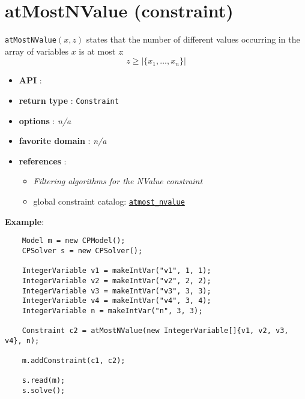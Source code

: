 \label{atmostnvalue}
\hypertarget{atmostnvalue}{}

\section{atMostNValue (constraint)}\label{atmostnvalue:atmostnvalueconstraint}\hypertarget{atmostnvalue:atmostnvalueconstraint}{}
\begin{notedef}
\texttt{atMostNValue}$(x,z)$ states that the number of different values occurring in the array of variables $x$ is at most \emph{z}:
$$z\ge|\{x_1,\ldots,x_n\}|$$  
\end{notedef}

\begin{itemize}
	\item \textbf{API} : 
	\item \textbf{return type} : \texttt{Constraint}
	\item \textbf{options} : \emph{n/a}
	\item \textbf{favorite domain} : \emph{n/a}
	\item \textbf{references} :
      \begin{itemize}
      \item  \cite{BessiereCPAIOR05} \emph{Filtering algorithms for the NValue constraint}
      \item global constraint catalog: \href{http://www.emn.fr/x-info/sdemasse/gccat/Catmost_nvalue.html}{\tt atmost\_nvalue}
      \end{itemize}
    \end{itemize}

\textbf{Example}:
\begin{lstlisting}
	Model m = new CPModel();
	CPSolver s = new CPSolver();
	
	IntegerVariable v1 = makeIntVar("v1", 1, 1);
	IntegerVariable v2 = makeIntVar("v2", 2, 2);
	IntegerVariable v3 = makeIntVar("v3", 3, 3);
	IntegerVariable v4 = makeIntVar("v4", 3, 4);
	IntegerVariable n = makeIntVar("n", 3, 3);
	
	Constraint c2 = atMostNValue(new IntegerVariable[]{v1, v2, v3, v4}, n);
	
	m.addConstraint(c1, c2);
	        
	s.read(m);
	s.solve();
\end{lstlisting}
